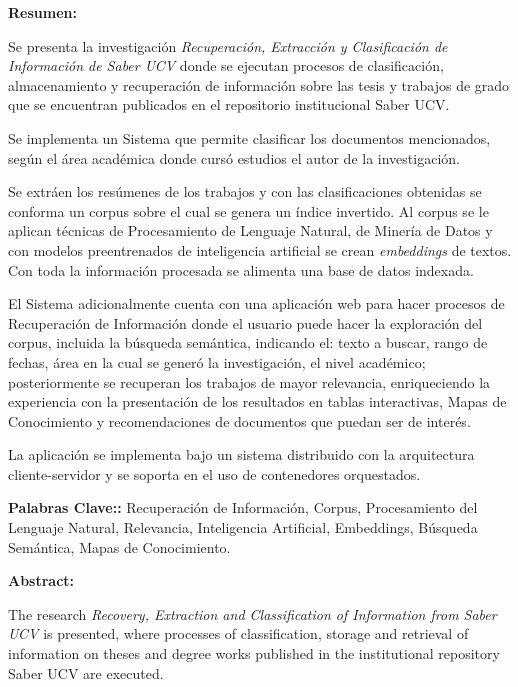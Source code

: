 \documentclass[
  12pt,
  openany]{book}
\begin{document}
\newpage
\thispagestyle{empty}
\large{\textbf{Resumen:}}

Se presenta la investigación \emph{Recuperación, Extracción y Clasificación de Información de Saber UCV} donde se ejecutan procesos de clasificación, almacenamiento y recuperación de información sobre las tesis y trabajos de grado que se encuentran publicados en el repositorio institucional Saber UCV.

Se implementa un Sistema que permite clasificar los documentos mencionados, según el área académica donde cursó estudios el autor de la investigación.

Se extráen los resúmenes de los trabajos y con las clasificaciones obtenidas se conforma un corpus sobre el cual se genera un índice invertido. Al corpus se le aplican técnicas de Procesamiento de Lenguaje Natural, de Minería de Datos y con modelos preentrenados de inteligencia artificial se crean  \textit{embeddings} de textos. Con toda la información procesada se alimenta una base de datos indexada.

El Sistema adicionalmente cuenta con una aplicación web para hacer procesos de Recuperación de Información donde el usuario puede hacer la exploración del corpus, incluida la búsqueda semántica, indicando el: texto a buscar, rango de fechas, área en la cual se generó la investigación, el nivel académico; posteriormente se recuperan los trabajos de mayor relevancia, enriqueciendo la experiencia con la presentación de los resultados en tablas interactivas, Mapas de Conocimiento y recomendaciones de documentos que puedan ser de interés.

La aplicación se implementa bajo un sistema distribuido con la arquitectura cliente-servidor y se soporta en el uso de contenedores orquestados.

\vspace*{2cm}

\textbf{Palabras Clave::} Recuperación de Información, Corpus, Procesamiento del Lenguaje Natural, Relevancia, Inteligencia Artificial, Embeddings, Búsqueda Semántica, Mapas de Conocimiento.



\newpage
\thispagestyle{empty}
\large{\textbf{Abstract:}}

The research \emph{Recovery, Extraction and Classification of Information from Saber UCV} is presented, where processes of classification, storage and retrieval of information on theses and degree works published in the institutional repository Saber UCV are executed.
\end{document}
